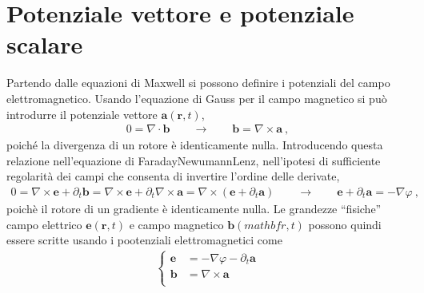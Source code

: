 \documentclass[letterpaper,10pt,english]{jupyterBook}
\begin{document}
\section{Potenziale vettore e potenziale scalare}
\label{\detokenize{ch/potentials:potenziale-vettore-e-potenziale-scalare}}
\sphinxAtStartPar
Partendo dalle equazioni di Maxwell si possono definire i potenziali del campo elettromagnetico. Usando l’equazione di Gauss per il campo magnetico si può introdurre il potenziale vettore \(\mathbf{a}(\mathbf{r},t)\),
\begin{equation*}
\begin{split}0 = \nabla \cdot \mathbf{b} \qquad \rightarrow \qquad \mathbf{b} = \nabla \times \mathbf{a} \ ,\end{split}
\end{equation*}
\sphinxAtStartPar
poiché la divergenza di un rotore è identicamente nulla. Introducendo questa relazione nell’equazione di Faraday\sphinxhyphen{}Newumann\sphinxhyphen{}Lenz, nell’ipotesi di sufficiente regolarità dei campi che consenta di invertire l’ordine delle derivate,
\begin{equation*}
\begin{split}0 = \nabla \times \mathbf{e} + \partial_t \mathbf{b} = \nabla \times \mathbf{e} +  \partial_t \nabla \times \mathbf{a} = \nabla \times (\mathbf{e} + \partial_t \mathbf{a}) \qquad \rightarrow \qquad \mathbf{e} + \partial_t \mathbf{a} = - \nabla \varphi \ ,\end{split}
\end{equation*}
\sphinxAtStartPar
poichè il rotore di un gradiente è identicamente nulla. Le grandezze “fisiche” campo elettrico \(\mathbf{e}(\mathbf{r},t)\) e campo magnetico \(\mathbf{b}(mathbf{r},t)\) possono quindi essere scritte usando i pootenziali elettromagnetici come
\begin{equation*}
\begin{split}\begin{cases}
 \mathbf{e} & = - \nabla \varphi - \partial_t \mathbf{a} \\
 \mathbf{b} & = \nabla \times \mathbf{a} \\
\end{cases}\end{split}
\end{equation*}
\end{document}
